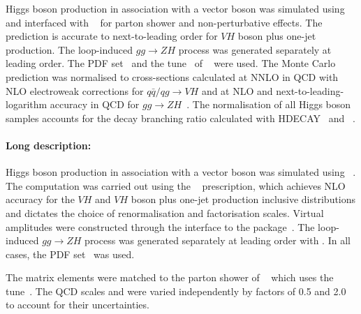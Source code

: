 Higgs boson production in association with a vector boson was simulated using
\POWHEGBOX[v2]~\cite{Nason:2009ai,Alioli:2010xd,Nason:2004rx,Frixione:2007vw} and interfaced with \PYTHIA[8]~\cite{Sjostrand:2014zea} for
parton shower and non-perturbative effects. The \POWHEG prediction is accurate to next-to-leading order for $VH$ boson plus one-jet production. 
The loop-induced $gg\to ZH$ process was generated separately at leading order. The \PDFforLHC[15nlo] PDF
set~\cite{Butterworth:2015oua} and the \AZNLO tune~\cite{STDM-2012-23} of \PYTHIA[8]~\cite{Sjostrand:2014zea} were used. The Monte Carlo
prediction was normalised to cross-sections calculated at NNLO in QCD with NLO electroweak corrections for $q\bar{q}/qg \to VH$ and at NLO
and next-to-leading-logarithm accuracy in QCD for $gg \to
ZH$~\cite{Ciccolini:2003jy,Brein:2003wg,Brein:2011vx,Altenkamp:2012sx,Denner:2014cla,Brein:2012ne,Harlander:2014wda}. The
normalisation of all Higgs boson samples accounts for the decay branching ratio calculated with 
HDECAY~\cite{Djouadi:1997yw,Spira:1997dg,Djouadi:2006bz} and \PROPHECY~\cite{Bredenstein:2006ha,Bredenstein:2006rh,Bredenstein:2006nk}.



\paragraph{Long description:}
Higgs boson production in association with a vector boson was simulated using
\POWHEGBOX[v2]~\cite{Nason:2009ai,Alioli:2010xd,Nason:2004rx,Frixione:2007vw}. The computation was carried out using the
\MINLO~\cite{Luisoni:2013cuh} prescription, which achieves NLO accuracy for the $VH$ and $VH$ boson plus one-jet production
inclusive distributions and dictates the choice of renormalisation and factorisation scales. Virtual amplitudes were constructed
through the interface to the \GOSAM package~\cite{Cullen:2011ac}. The loop-induced $gg\to ZH$ process was generated separately at
leading order with \POWHEG. In all cases, the \PDFforLHC[15nlo] PDF set~\cite{Butterworth:2015oua} was used.

The matrix elements were matched to the parton shower of \PYTHIA[8]~\cite{Sjostrand:2014zea} which uses the \AZNLO
tune~\cite{STDM-2012-23}.
The QCD scales \muR and \muF were varied independently by factors of 0.5 and 2.0 to account for their uncertainties.

